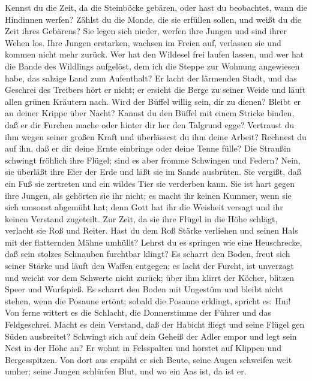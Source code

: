  Kennst du die Zeit, da die Steinböcke gebären, oder hast
du beobachtet, wann die Hindinnen werfen?  Zählst du die
Monde, die sie erfüllen sollen, und weißt du die Zeit ihres Gebärens?
 Sie legen sich nieder, werfen ihre Jungen und sind ihrer
Wehen los.  Ihre Jungen erstarken, wachsen im Freien auf,
verlassen sie und kommen nicht mehr zurück.  Wer hat den
Wildesel frei laufen lassen, und wer hat die Bande des Wildlings
aufgelöst,  dem ich die Steppe zur Wohnung angewiesen
habe, das salzige Land zum Aufenthalt?  Er lacht der
lärmenden Stadt, und das Geschrei des Treibers hört er nicht;
 er ersieht die Berge zu seiner Weide und läuft allen
grünen Kräutern nach.  Wird der Büffel willig sein, dir zu
dienen? Bleibt er an deiner Krippe über Nacht?  Kannst du
den Büffel mit einem Stricke binden, daß er dir Furchen mache oder
hinter dir her den Talgrund egge?  Vertraust du ihm wegen
seiner großen Kraft und überlässest du ihm deine Arbeit? 
Rechnest du auf ihn, daß er dir deine Ernte einbringe oder deine Tenne
fülle?  Die Straußin schwingt fröhlich ihre Flügel; sind
es aber fromme Schwingen und Federn?  Nein, sie überläßt
ihre Eier der Erde und läßt sie im Sande ausbrüten.  Sie
vergißt, daß ein Fuß sie zertreten und ein wildes Tier sie verderben
kann.  Sie ist hart gegen ihre Jungen, als gehörten sie
ihr nicht; es macht ihr keinen Kummer, wenn sie sich umsonst abgemüht
hat;  denn Gott hat ihr die Weisheit versagt und ihr
keinen Verstand zugeteilt.  Zur Zeit, da sie ihre Flügel
in die Höhe schlägt, verlacht sie Roß und Reiter.  Hast
du dem Roß Stärke verliehen und seinen Hals mit der flatternden Mähne
umhüllt?  Lehrst du es springen wie eine Heuschrecke, daß
sein stolzes Schnauben furchtbar klingt?  Es scharrt den
Boden, freut sich seiner Stärke und läuft den Waffen entgegen;
 es lacht der Furcht, ist unverzagt und weicht vor dem
Schwerte nicht zurück;  über ihm klirrt der Köcher,
blitzen Speer und Wurfspieß.  Es scharrt den Boden mit
Ungestüm und bleibt nicht stehen, wenn die Posaune ertönt;
 sobald die Posaune erklingt, spricht es: Hui! Von ferne
wittert es die Schlacht, die Donnerstimme der Führer und das
Feldgeschrei.  Macht es dein Verstand, daß der Habicht
fliegt und seine Flügel gen Süden ausbreitet?  Schwingt
sich auf dein Geheiß der Adler empor und legt sein Nest in der Höhe an?
 Er wohnt in Felsspalten und horstet auf Klippen und
Bergesspitzen.  Von dort aus erspäht er sich Beute, seine
Augen schweifen weit umher;  seine Jungen schlürfen Blut,
und wo ein Aas ist, da ist er.

